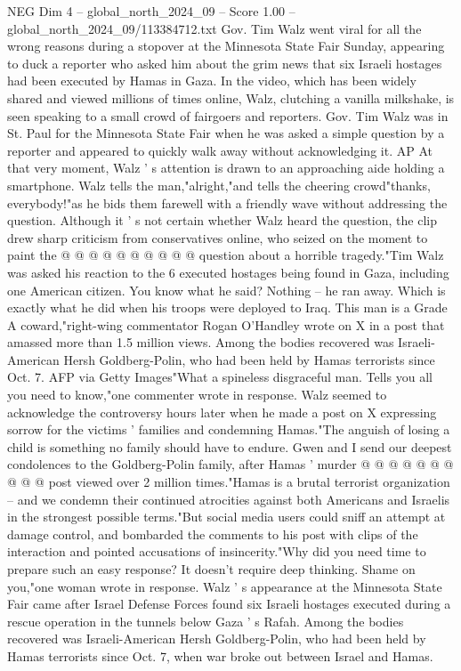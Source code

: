 \begin{textsample}{NEG Dim 4 – global\_north\_2024\_09 – Score 1.00 – global\_north\_2024\_09/113384712.txt}  \label{ex:f4_neg_144}
Gov.
Tim Walz went viral for all the wrong reasons during a stopover at the Minnesota State Fair Sunday, appearing to duck a reporter who asked him about the grim news that six Israeli hostages had been executed by Hamas in Gaza.
In the video, which has been widely shared and viewed millions of times online, Walz, clutching a vanilla milkshake, is seen speaking to a small crowd of fairgoers and reporters.
Gov.
Tim Walz was in St.
Paul for the Minnesota State Fair when he was asked a simple question by a reporter and appeared to quickly walk away without acknowledging it.
AP At that very moment, Walz ' s attention is drawn to an approaching aide holding a smartphone.
Walz tells the man,"alright,"and tells the cheering crowd"thanks, everybody!"as he bids them farewell with a friendly wave without addressing the question.
Although it ' s not certain whether Walz heard the question, the clip drew sharp criticism from conservatives online, who seized on the moment to paint the @ @ @ @ @ @ @ @ @ @ question about a horrible tragedy."Tim Walz was asked his reaction to the 6 executed hostages being found in Gaza, including one American citizen.
You know what he said?
Nothing -- he ran away.
Which is exactly what he did when his troops were deployed to Iraq.
This man is a Grade A coward,"right-wing commentator Rogan O'Handley wrote on X in a post that amassed more than 1.5 million views.
Among the bodies recovered was Israeli-American Hersh Goldberg-Polin, who had been held by Hamas terrorists since Oct. 7.
AFP via Getty Images"What a spineless disgraceful man.
Tells you all you need to know,"one commenter wrote in response.
Walz seemed to acknowledge the controversy hours later when he made a post on X expressing sorrow for the victims ' families and condemning Hamas."The anguish of losing a child is something no family should have to endure.
Gwen and I send our deepest condolences to the Goldberg-Polin family, after Hamas ' murder @ @ @ @ @ @ @ @ @ @ post viewed over 2 million times."Hamas is a brutal terrorist organization -- and we condemn their continued atrocities against both Americans and Israelis in the strongest possible terms."But social media users could sniff an attempt at damage control, and bombarded the comments to his post with clips of the interaction and pointed accusations of insincerity."Why did you need time to prepare such an easy response?
It doesn't require deep thinking.
Shame on you,"one woman wrote in response.
Walz ' s appearance at the Minnesota State Fair came after Israel Defense Forces found six Israeli hostages executed during a rescue operation in the tunnels below Gaza ' s Rafah.
Among the bodies recovered was Israeli-American Hersh Goldberg-Polin, who had been held by Hamas terrorists since Oct. 7, when war broke out between Israel and Hamas.

\end{textsample}
